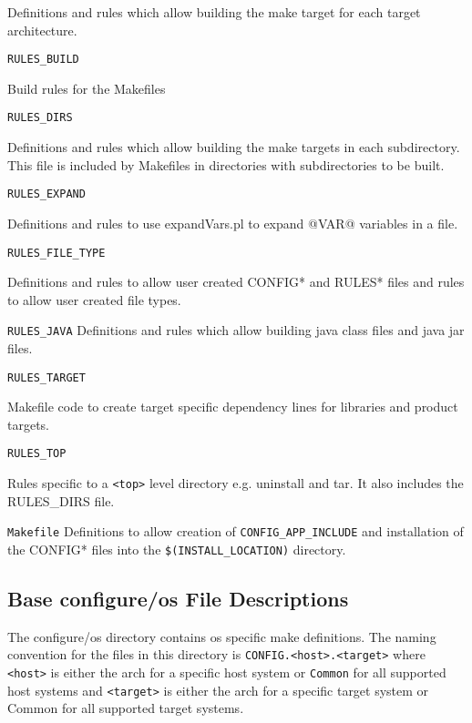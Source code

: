 \begin{description}
Definitions and rules which allow building the make target for each target architecture.

\item {}\verb|RULES_BUILD|

Build rules for the Makefiles 

\item {}\verb|RULES_DIRS|

Definitions and rules which allow building the make targets in each subdirectory. This file is included by Makefiles 
in directories with subdirectories to be built.

\item {}\verb|RULES_EXPAND|

Definitions and rules to use expandVars.pl to expand @VAR@ variables in a file.

\item {}\verb|RULES_FILE_TYPE|

Definitions and rules to allow user created CONFIG* and RULES* files and rules to allow user created file types.

\item {}\verb|RULES_JAVA| 
Definitions and rules which allow building java class files and java jar files.

\item {}\verb|RULES_TARGET|

Makefile code to create target specific dependency lines for libraries and product targets.

\item {}\verb|RULES_TOP|

Rules specific to a \verb|<top>| level directory e.g. uninstall and tar. It also includes the RULES\_DIRS file.

\item {}\verb|Makefile|
Definitions to allow creation of \verb|CONFIG_APP_INCLUDE| and installation of the CONFIG* files into the 
\verb|$(INSTALL_LOCATION)| directory.

\end{description}

\subsection{Base configure/os File Descriptions}

The configure/os directory contains os specific make definitions. The naming convention for the files in this directory is 
\verb|CONFIG.<host>.<target>| where \verb|<host>| is either the arch for a specific host system or \verb|Common| for all supported host 
systems and \verb|<target>| is either the arch for a specific target system or Common for all supported target systems. 

